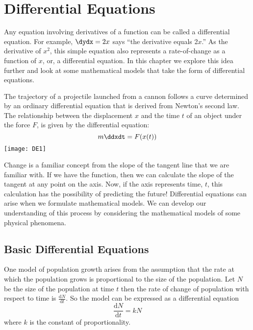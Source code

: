 \chapter{Differential Equations}
Any equation involving derivatives of a function can be called a differential equation.  For example, $ \dydx=2x$ says ``the derivative equals 2$x$.'' As the derivative of $x^2$, this simple equation also represents a rate-of-change as a function of $x$, or, a differential equation. In this chapter we explore this idea further and look at some mathematical models that take the form of differential equations.

\begin{multicols}{2}
The trajectory of a projectile launched from a cannon follows a curve determined by an ordinary differential equation that is derived from Newton's second law. The relationship between the displacement $x$ and the time $t$ of an object under the force $F$, is given by the differential equation: \[ m\ddxdt=F(x(t)) \]
	 \texttt{[image: DE1]}
\end{multicols}
Change is a familiar concept from the slope of the tangent line that we are familiar with. If we have the function, then we can calculate the slope of the tangent at any point on the axis. Now, if the axis represents time, $t$, this calculation has the possibility of predicting the future! Differential equations can arise when we formulate mathematical models.  We can develop our understanding of this process by considering the mathematical models of some physical phenomena. 



\section{Basic Differential Equations}
One model of population growth arises from the assumption that the rate at which the population grows is proportional to the size of the population.
Let $N$ be the size of the population at time $t$ then the rate of change of population with respect to time is $\frac{\mathrm{d} N}{\mathrm{d} t}\text{.}$  So the model can be expressed as a differential equation
\begin{equation*}\frac{\mathrm{d} N}{\mathrm{d} t} =k N
\end{equation*}
where $k$ is the constant of proportionality. 

